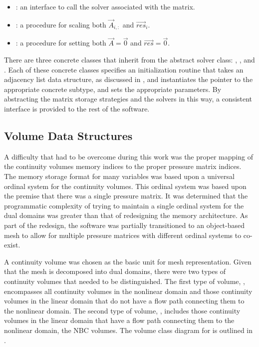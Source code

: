 \begin{itemize}
\item{  : an interface to call the solver associated with the matrix.}
\item{  : a procedure for scaling both $\vec{A}_{i, :}$ and $\vec{res}_{i}$.}
\item{  : a procedure for setting both $\vec{A} = \vec{0}$ and $\vec{res} = \vec{0}$.}
\end{itemize}

There are three concrete classes that inherit from the abstract solver class: , , and .
Each of these concrete classes specifies an initialization routine that takes an adjacency list data structure, as discussed in , and instantiates the  pointer to the appropriate concrete subtype, and sets the appropriate parameters.
By abstracting the matrix storage strategies and the solvers in this way, a consistent interface is provided to the rest of the software.

\subsection{Volume Data Structures}
\label{subsect:domDecompVolumeStructs}

A difficulty that had to be overcome during this work was the proper mapping of the continuity volumes memory indices to the proper pressure matrix indices.
The memory storage format for many variables was based upon a universal ordinal system for the continuity volumes.
This ordinal system was based upon the premise that there was a single pressure matrix.
It was determined that the programmatic complexity of trying to maintain a single ordinal system for the dual domains was greater than that of redesigning the memory architecture.
As part of the redesign, the software was partially transitioned to an object-based mesh to allow for multiple pressure matrices with different ordinal systems to co-exist.

A continuity volume was chosen as the basic unit for mesh representation.
Given that the mesh is decomposed into dual domains, there were two types of continuity volumes that needed to be distinguished.
The first type of volume, , encompasses all continuity volumes in the nonlinear domain and those continuity volumes in the linear domain that do not have a flow path connecting them to the nonlinear domain.
The second type of volume, , includes those continuity volumes in the linear domain that have a flow path connecting them to the nonlinear domain, the NBC volumes.
The volume class diagram for \cobra{} is outlined in .

